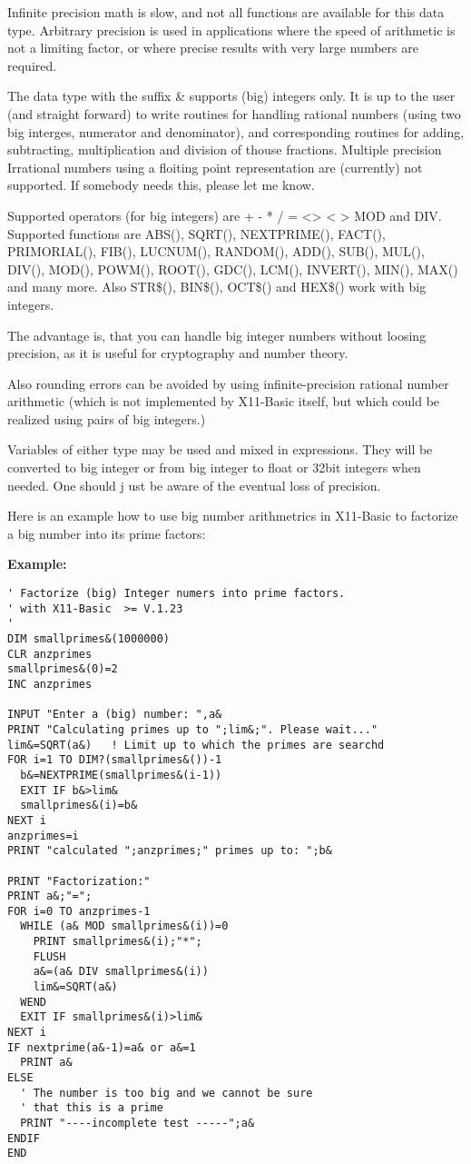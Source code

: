 Infinite precision math is slow, and not all functions are available
for this data type. Arbitrary precision is used in applications where the 
speed of arithmetic is not a limiting factor, or where precise results with 
very large numbers are required.

The data type with the suffix \& supports (big) integers only. It is up to the 
user (and straight forward) to write routines for handling rational numbers 
(using two big interges, numerator and denominator), and corresponding routines for
adding, subtracting, multiplication and division of thouse fractions. Multiple precision 
Irrational numbers using a floiting point representation are (currently) not 
supported. If somebody needs this, please let me know.

Supported operators (for big integers) are + - * / = <> < > MOD and DIV.
Supported functions are ABS(), SQRT(), 
NEXTPRIME(), FACT(), PRIMORIAL(), FIB(),  LUCNUM(), RANDOM(), ADD(), SUB(), MUL(), DIV(), MOD(), 
POWM(), ROOT(), GDC(), LCM(), INVERT(), MIN(), MAX() and many more. 
Also STR\$(), BIN\$(), OCT\$() and HEX\$() work with big integers.

The advantage is, that you can handle big integer numbers without loosing 
precision, as it is useful for cryptography and number theory.

Also rounding errors can be avoided by using infinite-precision rational number
arithmetic (which is not implemented by X11-Basic itself, but which could be realized using pairs of
big integers.)

Variables of either type may be used and mixed in expressions. They will be converted 
to big integer or from big integer to float or 32bit integers when needed. One should j
ust be aware of the eventual loss of precision.

Here is an example how to use big number arithmetrics in X11-Basic to factorize a big
number into its prime factors:

\begin{mdframed}[hidealllines=true,backgroundcolor=blue!20]
 {\bf Example:}
\begin{verbatim}
' Factorize (big) Integer numers into prime factors.
' with X11-Basic  >= V.1.23 
'
DIM smallprimes&(1000000)
CLR anzprimes
smallprimes&(0)=2
INC anzprimes

INPUT "Enter a (big) number: ",a&
PRINT "Calculating primes up to ";lim&;". Please wait..."
lim&=SQRT(a&)   ! Limit up to which the primes are searchd
FOR i=1 TO DIM?(smallprimes&())-1
  b&=NEXTPRIME(smallprimes&(i-1))
  EXIT IF b&>lim&
  smallprimes&(i)=b&
NEXT i
anzprimes=i
PRINT "calculated ";anzprimes;" primes up to: ";b&

PRINT "Factorization:"
PRINT a&;"=";
FOR i=0 TO anzprimes-1
  WHILE (a& MOD smallprimes&(i))=0
    PRINT smallprimes&(i);"*";
    FLUSH
    a&=(a& DIV smallprimes&(i))
    lim&=SQRT(a&)
  WEND
  EXIT IF smallprimes&(i)>lim&
NEXT i
IF nextprime(a&-1)=a& or a&=1
  PRINT a&
ELSE
  ' The number is too big and we cannot be sure 
  ' that this is a prime
  PRINT "----incomplete test -----";a&
ENDIF
END
\end{verbatim}\end{mdframed}

